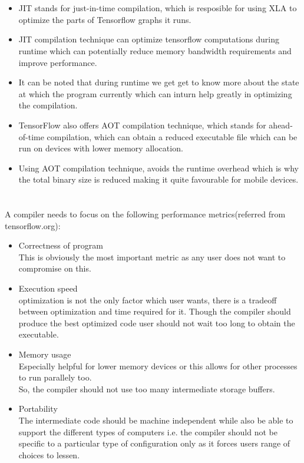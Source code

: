 \documentclass[12pt]{article}
\begin{document}
\section{}
\begin{itemize}
\item JIT stands for just-in-time compilation, which is resposible for using XLA to optimize the parts of Tensorflow graphs it runs.
\item JIT compilation technique can optimize tensorflow computations during runtime which can potentially reduce memory bandwidth requirements and improve performance.
\item It can be noted that during runtime we get get to know more about the state at which the program currently which can inturn help greatly in optimizing the compilation.
\item TensorFlow also offers AOT compilation technique, which stands for ahead-of-time compilation, which can obtain a reduced executable file which can be run on devices with lower memory allocation.
\item Using AOT compilation technique, avoids the runtime overhead which is why the total binary size is reduced making it quite favourable for mobile devices.
\end{itemize}

\section{}
A compiler needs to focus on the following performance metrics(referred from tensorflow.org):
\begin{itemize}
\item Correctness of program\\
This is obviously the most important metric as any user does not want to compromise on this.
\item Execution speed\\
optimization is not the only factor which user wants, there is a tradeoff between optimization and time required for it. Though the compiler should produce the best optimized code user should not wait too long to obtain the executable.
\item Memory usage\\
Especially helpful for lower memory devices or this allows for other processes to run parallely too.\\
So, the compiler should not use too many intermediate storage buffers.
\item Portability\\
The intermediate code should be machine independent while also be able to support the different types of computers i.e. the compiler should not be specific to a particular type of configuration only as it forces users range of choices to lessen.
\end{itemize}
\end{document}
